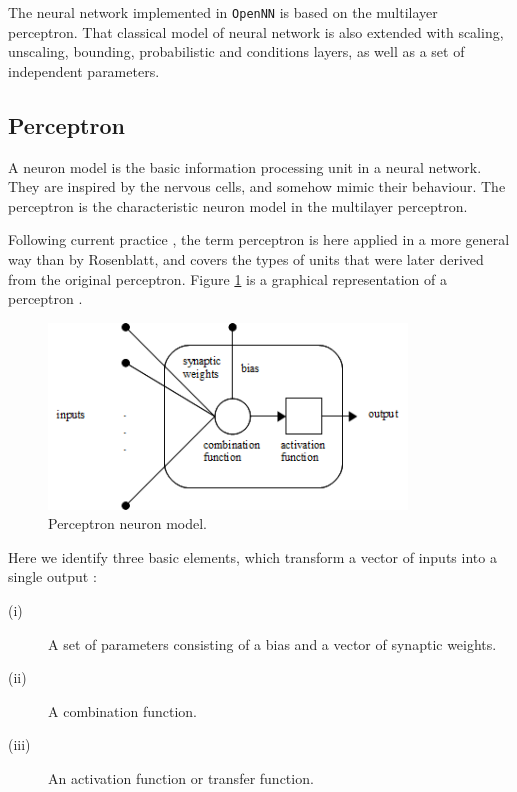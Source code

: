 
The neural network implemented in \texttt{OpenNN} is based on the multilayer perceptron. 
That classical model of neural network is also extended with scaling, unscaling, bounding, probabilistic and conditions layers, 
as well as a set of independent parameters. 

\subsection*{Perceptron}

A neuron model is the basic information processing
unit in a neural network. They are inspired by the nervous cells, and somehow mimic their behaviour. 
The perceptron is the characteristic neuron model in the multilayer perceptron. 

Following current
practice \cite{Sima2003}, the term perceptron is here applied in a
more general way than by Rosenblatt, and covers the types of units
that were later derived from the original perceptron. Figure \ref{PerceptronFigure} is a
graphical representation of a perceptron \cite{Haykin1994}.

\begin{figure}[h!]
\begin{center}
\includegraphics[width=0.85\textwidth]{neural_network/perceptron}
\caption{Perceptron neuron model.}\label{PerceptronFigure}
\end{center}
\end{figure}

Here we identify three
basic elements, which transform a vector of inputs into a single output \cite{Belanche2000}: 

\begin{description}
\item[(i)] A set of parameters consisting of a bias and a vector of synaptic weights.
\item[(ii)] A combination function.  
\item[(iii)] An activation function or transfer function.
\end{description}

